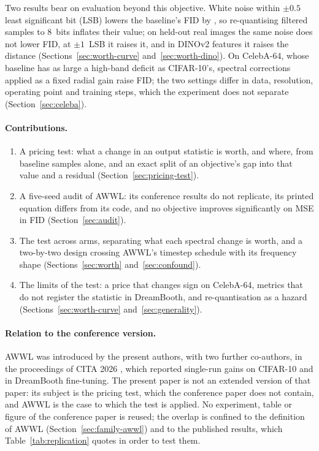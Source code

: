 Two results bear on evaluation beyond this objective. White noise within
$\pm0.5$ least significant bit (LSB) lowers the baseline's FID by
\priceNoiseHalfValue, so re-quantising filtered samples to 8~bits inflates
their value; on held-out real images the same noise does not lower FID, at
$\pm1$~LSB it raises it, and in DINOv2 features it raises the distance
(Sections~\ref{sec:worth-curve} and~\ref{sec:worth-dino}). On CelebA-64,
whose baseline has as large a high-band deficit as CIFAR-10's, spectral
corrections applied as a fixed radial gain raise FID; the two settings differ
in data, resolution, operating point and training steps, which the
experiment does not separate (Section~\ref{sec:celeba}).

\paragraph{Contributions.}
\begin{enumerate}
  \item A pricing test: what a change in an output statistic is worth, and
    where, from baseline samples alone, and an exact split of an objective's
    gap into that value and a residual (Section~\ref{sec:pricing-test}).
  \item A five-seed audit of AWWL: its conference results do not replicate,
    its printed equation differs from its code, and no objective improves
    significantly on MSE in FID (Section~\ref{sec:audit}).
  \item The test across \nFamilyPricing{} arms, separating what each spectral
    change is worth, and a two-by-two design crossing AWWL's timestep
    schedule with its frequency shape (Sections~\ref{sec:worth}
    and~\ref{sec:confound}).
  \item The limits of the test: a price that changes sign on CelebA-64,
    metrics that do not register the statistic in DreamBooth, and
    re-quantisation as a hazard (Sections~\ref{sec:worth-curve}
    and~\ref{sec:generality}).
\end{enumerate}

\paragraph{Relation to the conference version.}
AWWL was introduced by the present authors, with two further co-authors, in the proceedings of CITA 2026
\citep{thao2026awwl}, which reported single-run gains on CIFAR-10 and in
DreamBooth fine-tuning. The present paper is not an extended version of that
paper: its subject is the pricing test, which the conference paper does not
contain, and AWWL is the case to which the test is applied. No experiment,
table or figure of the conference paper is reused; the overlap is confined to
the definition of AWWL (Section~\ref{sec:family-awwl}) and to the published
results, which Table~\ref{tab:replication} quotes in order to test them.

